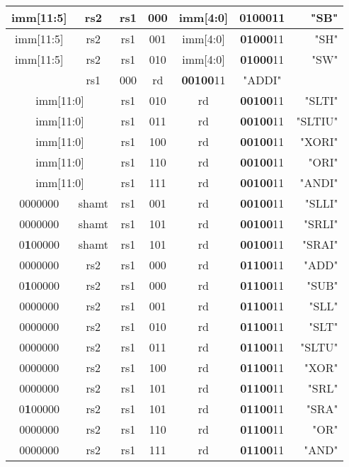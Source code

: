\begin{threeparttable}[h!]
\begin{tabular}{|c|c|c|c|c|c|r|}
	 	imm[11:5] & rs2 & rs1 & \setrow{\bfseries}000 & imm[4:0] & \textbf{01000}11 & "SB" \\\hline
	 	imm[11:5] & rs2 & rs1 & \setrow{\bfseries}001 & imm[4:0] & \textbf{01000}11 & "SH" \\\hline
	 	imm[11:5] & rs2 & rs1 & \setrow{\bfseries}010 & imm[4:0] & \textbf{01000}11 & "SW" \\\Xhline{5\arrayrulewidth}
	 	
		\multicolumn{2}{|c|}{imm[11:0]} & rs1 & \setrow{\bfseries}000 & rd &\textbf{00100}11 & "ADDI"  \\\hline
		\multicolumn{2}{|c|}{imm[11:0]} & rs1 & \setrow{\bfseries}010 & rd &\textbf{00100}11 & "SLTI"  \\\hline
		\multicolumn{2}{|c|}{imm[11:0]} & rs1 & \setrow{\bfseries}011 & rd &\textbf{00100}11 & "SLTIU" \\\hline
		\multicolumn{2}{|c|}{imm[11:0]} & rs1 & \setrow{\bfseries}100 & rd &\textbf{00100}11 & "XORI"  \\\hline
		\multicolumn{2}{|c|}{imm[11:0]} & rs1 & \setrow{\bfseries}110 & rd &\textbf{00100}11 & "ORI"   \\\hline
		\multicolumn{2}{|c|}{imm[11:0]} & rs1 & \setrow{\bfseries}111 & rd &\textbf{00100}11 & "ANDI"  \\\hline
		0000000 & shamt & rs1 & \setrow{\bfseries}001 & rd &\textbf{00100}11 & "SLLI" \\\hline
		0000000 & shamt & rs1 & \setrow{\bfseries}101 & rd &\textbf{00100}11 & "SRLI" \\\hline
		0\textbf{1}00000 & shamt & rs1 & \setrow{\bfseries}101 & rd & \textbf{00100}11 & "SRAI" \\\Xhline{5\arrayrulewidth}
		
		0000000 & rs2   & rs1 & \setrow{\bfseries}000 & rd & \textbf{01100}11 & "ADD"  \\\hline
		0\textbf{1}00000 & rs2   & rs1 & \setrow{\bfseries}000 & rd & \textbf{01100}11 & "SUB"  \\\hline
		0000000 & rs2   & rs1 & \setrow{\bfseries}001 & rd & \textbf{01100}11 & "SLL"  \\\hline
		0000000 & rs2   & rs1 & \setrow{\bfseries}010 & rd & \textbf{01100}11 & "SLT"  \\\hline
		0000000 & rs2   & rs1 & \setrow{\bfseries}011 & rd & \textbf{01100}11 & "SLTU" \\\hline
		0000000 & rs2   & rs1 & \setrow{\bfseries}100 & rd & \textbf{01100}11 & "XOR"  \\\hline
		0000000 & rs2   & rs1 & \setrow{\bfseries}101 & rd & \textbf{01100}11 & "SRL"  \\\hline
		0\textbf{1}00000 & rs2   & rs1 & \setrow{\bfseries}101 & rd & \textbf{01100}11 & "SRA"  \\\hline
		0000000 & rs2   & rs1 & \setrow{\bfseries}110 & rd & \textbf{01100}11 & "OR"   \\\hline
		0000000 & rs2   & rs1 & \setrow{\bfseries}111 & rd & \textbf{01100}11 & "AND"  \\\hline
	 	\end{tabular}
 		

\end{threeparttable}
